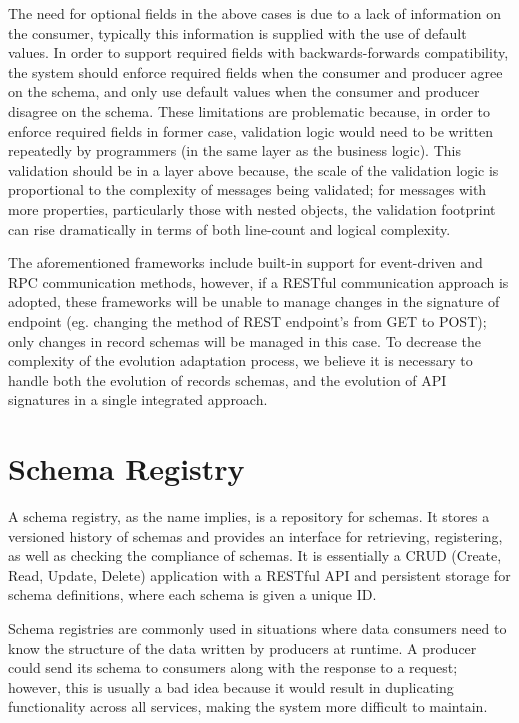 The need for optional fields in the above cases is due to a lack of information on the consumer, typically this information is supplied with the use of default values.
In order to support required fields with backwards-forwards compatibility, the system should enforce required fields when the consumer and producer agree on the schema,
and only use default values when the consumer and producer disagree on the schema.
These limitations are problematic because, in order to enforce required fields in former case,
validation logic would need to be written repeatedly by programmers (in the same layer as the business logic).
This validation should be in a layer above because, the scale of the validation logic is proportional to the complexity of messages being validated;
for messages with more properties, particularly those with nested objects, the validation footprint can rise dramatically in terms of both line-count and logical complexity.

The aforementioned frameworks include built-in support for event-driven and RPC communication methods,
however, if a RESTful communication approach is adopted, these frameworks will be unable to manage changes in the signature of endpoint
(eg. changing the method of REST endpoint's from GET to POST); only changes in record schemas will be managed in this case.
To decrease the complexity of the evolution adaptation process, we believe it is necessary to handle both the evolution of records schemas, and the evolution of API signatures in a single integrated approach.

\section{Schema Registry} %
\label{sec:schema_registry}

A schema registry, as the name implies, is a repository for schemas.
It stores a versioned history of schemas and provides an interface for retrieving, registering, as well as checking the compliance of schemas.
It is essentially a CRUD (Create, Read, Update, Delete) application with a RESTful API and persistent storage for schema definitions, where each schema is given a unique ID.

Schema registries are commonly used in situations where data consumers need to know the structure of the data written by producers at runtime.
A producer could send its schema to consumers along with the response to a request;
however, this is usually a bad idea because it would result in duplicating functionality across all services, making the system more difficult to maintain.

